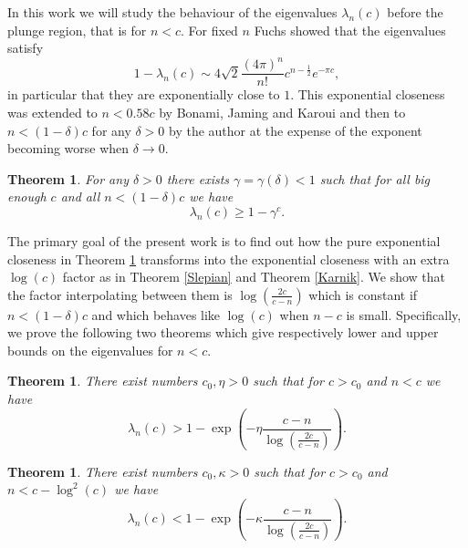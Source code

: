 \documentclass[12pt]{amsart}
\numberwithin{equation}{section}
\newtheorem{theorem}[Thm]{Theorem}
\begin{document}
In this work we will study the behaviour of the eigenvalues $\lambda_{n}(c)$ before the plunge region, that is for $n < c$. For fixed $n$ Fuchs \cite{Fuc} showed that the eigenvalues satisfy 
$$1-\lambda_n(c) \sim 4\sqrt{2}\frac{(4\pi)^n}{n!} c^{n-\frac{1}{2}}e^{-\pi c},$$
in particular that they are exponentially close to $1$. This exponential closeness was extended to $n< 0.58 c$ by Bonami, Jaming and Karoui \cite{Jam} and then to $n < (1-\delta)c$ for any $\delta > 0$ by the author \cite{Kulikov} at the expense of the exponent becoming worse when $\delta\to 0$.
\begin{theorem}\label{Kulikov}
For any $\delta > 0$ there exists $\gamma = \gamma(\delta) < 1$ such that for all big enough $c$ and all $n < (1-\delta)c$ we have
$$\lambda_n(c) \ge 1 - \gamma^c.$$
\end{theorem}
The primary goal of the present work is to find out how the pure exponential closeness in Theorem \ref{Kulikov} transforms into the exponential closeness with an extra $\log (c)$ factor as in Theorem \ref{Slepian} and Theorem \ref{Karnik}. We show that the factor interpolating between them is $\log(\frac{2c}{c-n})$ which is constant if $n < (1-\delta)c$ and which behaves like $\log(c)$ when $n-c$ is small. Specifically, we prove the following two theorems which give respectively lower and upper bounds on the eigenvalues for $n < c$.

\begin{theorem}\label{lower time}
There exist numbers $c_0, \eta > 0$ such that for $c > c_0$ and $n < c$ we have
$$\lambda_n(c) > 1 - \exp\left(-\eta\frac{c-n}{\log(\frac{2c}{c-n})}\right).$$
\end{theorem}
\begin{theorem}\label{upper time}
There exist numbers $c_0, \kappa > 0$ such that for $c > c_0$ and $n < c-\log^2(c)$ we have
$$\lambda_n(c) < 1 - \exp\left(-\kappa\frac{c-n}{\log(\frac{2c}{c-n})}\right).$$
\end{theorem}
\end{document}
